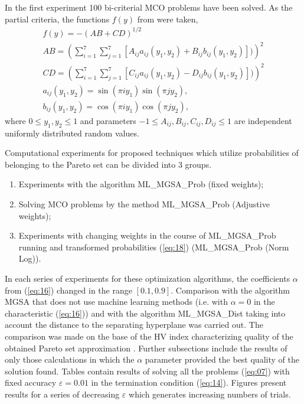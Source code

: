 \documentclass[runningheads]{llncs}
\begin{document}
In the first experiment 100 bi-criterial MCO problems have been solved. As the partial criteria, the functions $f(y)$ from \cite{ML_MCO_2023} were taken,
\begin{equation}
    \label{eq:19}
		\begin{matrix}
		  f(y)= -(AB + CD)^{1/2} \\
			AB =(\sum_{i=1}^7{\sum_{j=1}^7{[A_{ij} a_{ij} (y_1,y_2) + B_{ij} b_{ij} (y_1,y_2)])}})^2 \\
			CD =(\sum_{i=1}^7{\sum_{j=1}^7{[C_{ij} a_{ij} (y_1,y_2) - D_{ij} b_{ij} (y_1,y_2)])}})^2 \\
			a_{ij} (y_1,y_2) = \sin(\pi i y_1) \sin(\pi j y_2), \\
			b_{ij} (y_1,y_2) = \cos(\pi i y_1) \cos(\pi j y_2),
		\end{matrix}
\end{equation}
where $0 \leq y_1, y_2 \leq 1$ and parameters $-1 \leq A_{ij},B_{ij},C_{ij},D_{ij} \leq 1$ are independent uniformly distributed random values.

Computational experiments for proposed techniques which utilize probabilities of belonging to the Pareto set can be divided into 3 groups.
\begin{enumerate}
	\item 	Experiments with the algorithm ML\_MGSA\_Prob (fixed weights);
	\item 	Solving MCO problems by the method ML\_MGSA\_Prob (Adjustive weights);
	\item 	Experiments with changing weights in the course of ML\_MGSA\_Prob running and transformed probabilities (\ref{eq:18})  (ML\_MGSA\_Prob (Norm Log)).
\end{enumerate}
	
In each series of experiments for these optimization algorithms, the coefficients $\alpha$ from (\ref{eq:16}) changed in the range $[0.1, 0.9]$. Comparison with the algorithm MGSA that does not use machine learning methods (i.e. with $\alpha = 0$ in the characteristic (\ref{eq:16})) and with the algorithm ML\_MGSA\_Dist taking into account the distance to the separating hyperplane was carried out. The comparison was made on the base of  the HV index characterizing quality of the obtained Pareto set approximation \cite{ML_MCO_2023,Evtushenko2014}. Further subsections include the results of only those calculations in which the $\alpha$ parameter provided the best quality of the solution found. Tables contain results of solving all the problems (\ref{eq:07}) with fixed accuracy $\varepsilon=0.01$ in the termination condition (\ref{eq:14}). Figures present results for a series of decreasing $\varepsilon$ which generates increasing numbers of trials.
\end{document}
